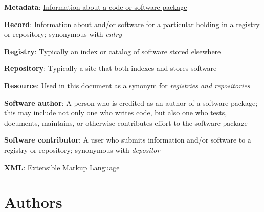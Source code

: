 \documentclass[11pt]{article}
\begin{document}
\textbf{Metadata}: \href{https://en.wikipedia.org/wiki/Metadata}{Information about a code or software package}

\textbf{Record}: Information about and/or software for a particular holding in a registry or repository; synonymous with \emph{entry}

\textbf{Registry}: Typically an index or catalog of software stored elsewhere

\textbf{Repository}: Typically a site that both indexes and stores software

\textbf{Resource}: Used in this document as a synonym for \emph{registries and repositories}

\textbf{Software author}: A person who is credited as an author of a software package; this may include not only one who writes code, but also one who tests, documents, maintains, or otherwise contributes effort to the software package

\textbf{Software contributor}: A user who submits information and/or software to a registry or repository; synonymous with \emph{depositor}

\textbf{XML}: \href{https://en.wikipedia.org/wiki/XML}{Extensible Markup Language}


\section{Authors}
\label{authors}
\end{document}
